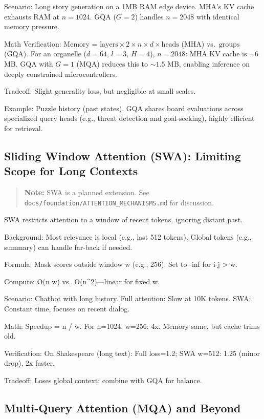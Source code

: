 \documentclass[
]{article}
\begin{document}
Scenario: Long story generation on a 1MB RAM edge device. MHA's KV cache
exhausts RAM at \(n=1024\). GQA (\(G=2\)) handles \(n=2048\) with
identical memory pressure.

Math Verification: Memory =
\(\text{layers} \times 2 \times n \times d \times \text{heads}\) (MHA)
vs.~\(\text{groups}\) (GQA). For an organelle (\(d=64\), \(l=3\),
\(H=4\)), \(n=2048\): MHA KV cache is \(\sim 6\) MB. GQA with \(G=1\)
(MQA) reduces this to \(\sim 1.5\) MB, enabling inference on deeply
constrained microcontrollers.

Tradeoff: Slight generality loss, but negligible at small scales.

Example: Puzzle history (past states). GQA shares board evaluations
across specialized query heads (e.g., threat detection and
goal-seeking), highly efficient for retrieval.

\subsection{Sliding Window Attention (SWA): Limiting Scope for Long
Contexts}\label{sliding-window-attention-swa-limiting-scope-for-long-contexts}

\begin{quote}
\textbf{Note:} SWA is a planned extension. See
\texttt{docs/foundation/ATTENTION\_MECHANISMS.md} for discussion.
\end{quote}

SWA restricts attention to a window of recent tokens, ignoring distant
past.

Background: Most relevance is local (e.g., last 512 tokens). Global
tokens (e.g., summary) can handle far-back if needed.

Formula: Mask scores outside window w (e.g., 256): Set to -inf for
\textbar i-j\textbar{} \textgreater{} w.

Compute: O(n w) vs.~O(n\^{}2)---linear for fixed w.

Scenario: Chatbot with long history. Full attention: Slow at 10K tokens.
SWA: Constant time, focuses on recent dialog.

Math: Speedup = n / w. For n=1024, w=256: 4x. Memory same, but cache
trims old.

Verification: On Shakespeare (long text): Full loss=1.2; SWA w=512: 1.25
(minor drop), 2x faster.

Tradeoff: Loses global context; combine with GQA for balance.

\subsection{Multi-Query Attention (MQA) and
Beyond}\label{multi-query-attention-mqa-and-beyond}
\end{document}
